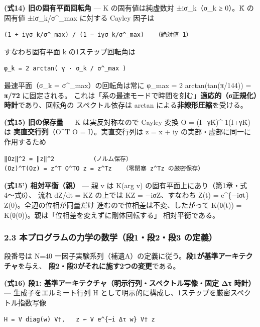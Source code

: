 \documentclass[
  a4paper,
]{ltjsarticle}
\begin{document}
\textbf{(式14) 旧の固有平面回転角} --- K の固有値は純虚数対 ±iσ\_k（σ\_k
≥ 0）。K̃ の固有値 ±iσ\_k/σ\^{}\_max に対する Cayley 因子は

\begin{verbatim}
(1 + iγσ_k/σ^_max) / (1 − iγσ_k/σ^_max)   （絶対値 1）
\end{verbatim}

すなわち固有平面 k の1ステップ回転角は

\begin{verbatim}
φ_k = 2 arctan( γ · σ_k / σ^_max )
\end{verbatim}

最速平面（σ\_k = σ\^{}\_max）の回転角は常に φ\_max = 2
arctan(tan(π/144)) = \textbf{π/72} に固定される。
これは「系の最速モードで時間を刻む」\textbf{適応的（σ正規化）時計}であり、回転角の
スペクトル依存は arctan による\textbf{非線形圧縮}を受ける。

\textbf{(式15) 旧の保存量} --- K は実反対称なので Cayley 変換 O =
(I−γK̃)\^{}-1(I+γK̃) は \textbf{実直交行列}（O\^{}T O = I）。実直交行列は
z = x + iy の実部・虚部に同一に作用するため

\begin{verbatim}
‖Oz‖^2 = ‖z‖^2          （ノルム保存）
(Oz)^T(Oz) = z^T O^TO z = z^Tz   （零閉塞 z^Tz の厳密保存）
\end{verbatim}

\textbf{(式15') 相対平衡（親）} --- 親 v は K(arg v)
の固有平面上にあり（第1章・式4〜式6）、 流れ dZ/dt = KZ の上では KZ =
−iσZ、すなわち Z(t) = e\^{}\{−iσt\} Z(0)。全辺の位相が同量だけ
進むので位相差は不変、したがって K(θ(t)) =
K(θ(0))。親は「位相差を変えずに剛体回転する」 相対平衡である。

\subsubsection{2.3 本プログラムの力学の数学（段1・段2・段3
の定義）}\label{ux672cux30d7ux30edux30b0ux30e9ux30e0ux306eux529bux5b66ux306eux6570ux5b66ux6bb51ux6bb52ux6bb53-ux306eux5b9aux7fa9}

段番号は N=40
一因子実験系列（補遺A）の定義に従う。\textbf{段1が基準アーキテクチャ}を与え、
\textbf{段2・段3がそれに施す2つの変更}である。

\textbf{(式16) 段1: 基準アーキテクチャ（明示行列・スペクトル写像・固定
Δτ 時計）} --- 生成子をエルミート行列 H
として明示的に構成し、1ステップを厳密スペクトル指数写像

\begin{verbatim}
H = V diag(w) V†,   z ← V e^{−i Δτ w} V† z
\end{verbatim}
\end{document}
